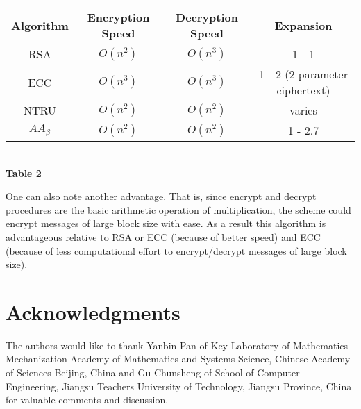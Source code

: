 \documentclass{llncs}
\begin{document}
\begin{center}
\begin{tabular}{|c|c|c|c|}
        \hline
        Algorithm & Encryption Speed & Decryption Speed & Expansion  \\ \hline
        RSA   & $O(n^2)$ & $O(n^3)$ & 1 - 1\\ \hline
        ECC  & $O(n^3)$ & $O(n^3)$ & 1 - 2 (2 parameter ciphertext)\\ \hline
        NTRU & $O(n^2)$ & $O(n^2)$ & varies\\ \hline
        $AA_\beta$ & $O(n^2)$ & $O(n^2)$ & 1 - 2.7\\ \hline
    \end{tabular}
\newline \\ \textbf{Table 2} 
\end{center}


One can also note another advantage. That is, since encrypt and
decrypt procedures are the basic arithmetic operation of
multiplication, the scheme could encrypt messages of large block
size with ease. As a result this algorithm is advantageous
relative to RSA or ECC (because of better speed) and ECC (because
of less computational effort to encrypt/decrypt messages of large
block size).

\section*{Acknowledgments}The authors would like to thank Yanbin Pan
of Key Laboratory of Mathematics Mechanization Academy of
Mathematics and Systems Science, Chinese Academy of Sciences
Beijing, China and Gu Chunsheng of School of Computer Engineering,
Jiangsu Teachers University of Technology, Jiangsu Province, China
for valuable comments and discussion.
\end{document}
